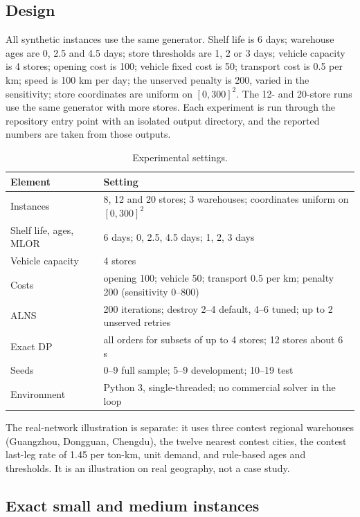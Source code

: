 \documentclass[preprint,12pt]{elsarticle}
\begin{document}
\subsection{Design}

All synthetic instances use the same generator. Shelf life is 6 days; warehouse ages are 0, 2.5 and 4.5 days; store thresholds are 1, 2 or 3 days; vehicle capacity is 4 stores; opening cost is 100; vehicle fixed cost is 50; transport cost is 0.5 per km; speed is 100 km per day; the unserved penalty is 200, varied in the sensitivity; store coordinates are uniform on $[0,300]^2$. The 12- and 20-store runs use the same generator with more stores. Each experiment is run through the repository entry point with an isolated output directory, and the reported numbers are taken from those outputs.

\begin{table}[t]
\centering
\caption{Experimental settings.}
\label{tab:settings}
\small
\begin{tabular}{p{2.8cm}p{9.4cm}}
\toprule
Element & Setting \\
\midrule
Instances & 8, 12 and 20 stores; 3 warehouses; coordinates uniform on $[0,300]^2$ \\
Shelf life, ages, MLOR & 6 days; 0, 2.5, 4.5 days; 1, 2, 3 days \\
Vehicle capacity & 4 stores \\
Costs & opening 100; vehicle 50; transport 0.5 per km; penalty 200 (sensitivity 0--800) \\
ALNS & 200 iterations; destroy 2--4 default, 4--6 tuned; up to 2 unserved retries \\
Exact DP & all orders for subsets of up to 4 stores; 12 stores about 6 s \\
Seeds & 0--9 full sample; 5--9 development; 10--19 test \\
Environment & Python 3, single-threaded; no commercial solver in the loop \\
\bottomrule
\end{tabular}
\end{table}

The real-network illustration is separate: it uses three contest regional warehouses (Guangzhou, Dongguan, Chengdu), the twelve nearest contest cities, the contest last-leg rate of 1.45 per ton-km, unit demand, and rule-based ages and thresholds. It is an illustration on real geography, not a case study.

\subsection{Exact small and medium instances}
\end{document}

